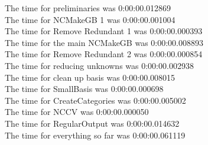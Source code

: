\documentclass[rep10,leqno]{report}
\begin{document}
\noindent
The time for preliminaries was 0:00:00.012869\\
The time for NCMakeGB 1 was 0:00:00.001004\\
The time for Remove Redundant 1 was 0:00:00.000393\\
The time for the main NCMakeGB was 0:00:00.008893\\
The time for Remove Redundant 2 was 0:00:00.000854\\
The time for reducing unknowns was 0:00:00.002938\\
The time for clean up basis was 0:00:00.008015\\
The time for SmallBasis was 0:00:00.000698\\
The time for CreateCategories was 0:00:00.005002\\
The time for NCCV was 0:00:00.000050\\
The time for RegularOutput was 0:00:00.014632\\
The time for everything so far was 0:00:00.061119\\
\end{document}
